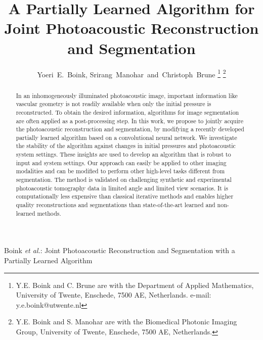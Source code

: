 \documentclass[journal]{IEEEtran}
\begin{document}
\IEEEoverridecommandlockouts
{}

\title{A Partially Learned Algorithm for Joint Photoacoustic Reconstruction and Segmentation}

\author{Yoeri~E.~Boink, Srirang~Manohar~and~Christoph~Brune\vspace{-5mm}%
\thanks{Y.E. Boink and C. Brune are with the Department
of Applied Mathematics, University of Twente, Enschede, 7500 AE, Netherlands. e-mail: y.e.boink@utwente.nl}%
\thanks{Y.E. Boink and S. Manohar are with the Biomedical Photonic Imaging Group, University of Twente, Enschede, 7500 AE, Netherlands.}}

%
{Boink \MakeLowercase{\textit{et al.}}: Joint Photoacoustic Reconstruction and Segmentation with a Partially Learned Algorithm}

\maketitle

\begin{abstract}
In an inhomogeneously illuminated photoacoustic image, important information like vascular geometry is not readily available when only the initial pressure is reconstructed. To obtain the desired information, algorithms for image segmentation are often applied as a post-processing step. In this work, we propose to jointly acquire the photoacoustic reconstruction and segmentation, by modifying a recently developed partially learned algorithm based on a convolutional neural network. We investigate the stability of the algorithm against changes in initial pressures and photoacoustic system settings. These insights are used to develop an algorithm that is robust to input and system settings. Our approach can easily be applied to other imaging modalities and can be modified to perform other high-level tasks different from segmentation. The method is validated on challenging synthetic and experimental photoacoustic tomography data in limited angle and limited view scenarios. It is computationally less expensive than classical iterative methods and enables higher quality reconstructions and segmentations than state-of-the-art learned and non-learned methods.
\end{abstract}
\end{document}
